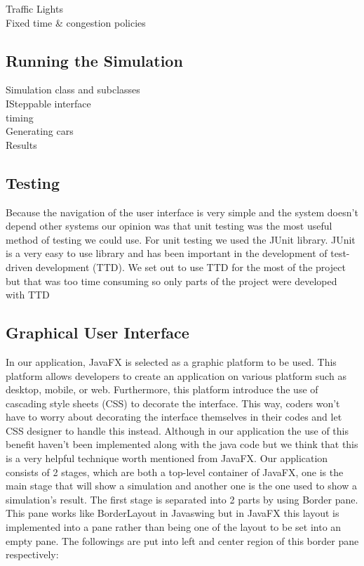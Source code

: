 \documentclass[11pt]{article}
\begin{document}
Traffic Lights
\\
Fixed time \& congestion policies

\subsection{Running the Simulation}

Simulation class and subclasses
\\
ISteppable interface
\\
timing
\\
Generating cars
\\
Results

\subsection{Testing}
Because the navigation of the user interface is very simple and the system doesn't depend other systems our opinion was that unit testing was the most useful method of testing we could use. For unit testing we used the JUnit library. JUnit is a very easy to use library and has been important in the development of test-driven development (TTD). We set out to use TTD for the most of the project but that was too time consuming so only parts of the project were developed with TTD

\subsection{Graphical User Interface}
In our application, JavaFX is selected as a graphic platform to be used. This platform allows developers to create an application on various platform such as desktop, mobile, or web. Furthermore, this platform introduce the use of cascading style sheets (CSS) to decorate the interface. This way, coders won’t have to worry about decorating the interface themselves in their codes and let CSS designer to handle this instead. Although in our application the use of this benefit haven’t been implemented along with the java code but we think that this is a very helpful technique worth mentioned from JavaFX.
Our application consists of 2 stages, which are both a top-level container of JavaFX, one is the main stage that will show a simulation and another one is the one used to show a simulation’s result. The first stage is separated into 2 parts by using Border pane. This pane works like BorderLayout in Javaswing but in JavaFX this layout is implemented into a pane rather than being one of the layout to be set into an empty pane. The followings are put into left and center region of this border pane respectively:
\end{document}
